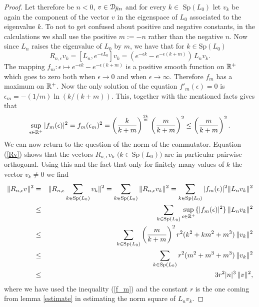 \documentclass[12pt]{article}
\begin{document}
\begin{proof}
Let therefore be $n<0$, $v \in {\mathcal D}\!_{f\!in}$ and for every $k \in$ Sp$(L_0)$ 
let $v_k$ be again the component of the vector $v$ in the eigenspace of
$L_0$ associated to the eigenvalue $k$.
To not to get confused about
positive and negative constants, in the calculations we shall use the
positive $m:=-n$ rather than the negative $n$. Now since $L_n$ raises the
eigenvalue of $L_0$ by $m$, we have that for $k \in $Sp$(L_0)$ 
\begin{equation}
\label{Rv} 
R_{n,\epsilon}v_k=[L_n,e^{-\epsilon L_0}]v_k =
(e^{-\epsilon k}-e^{-\epsilon (k+m)})\,L_nv_k. 
\end{equation} 
The mapping $f_m: \epsilon \mapsto e^{-\epsilon k}-e^{-\epsilon (k+m)}$ 
is a positive smooth function on ${\mathbb R}^+$ which goes to zero both when
$\epsilon \rightarrow 0$ and when $\epsilon \rightarrow \infty$. Therefore
$f_m$ has a maximum on ${\mathbb R}^+$.
Now the only solution of the
equation $f'_m(\epsilon)=0$ is $\epsilon_m=-(1/m) \ln (k/(k+m))$. This,
together with the mentioned facts gives that 
\begin{equation} 
\label{f_m}
\mathop{\rm sup}_{\epsilon \in {\mathbb R}^+}{|f_m(\epsilon)|^2}=
f_m(\epsilon_m)^2= \left(\frac{k}{k+m}\right)^{\frac{2k}{m}}
\left(\frac{m}{k+m}\right)^2 \leq \left( \frac{m}{k+m} \right)^2.
\end{equation} 
We can now return to the question of the norm of the
commutator. Equation (\ref{Rv}) shows that the vectors
$R_{n,\epsilon}v_k\,\, (k \in $Sp$(L_0))$ are in particular 
pairwise orthogonal. Using this and the fact that
only for finitely many values of $k$ the vector $v_k \neq 0$ we find
\begin{eqnarray} 
\nonumber 
\|R_{n,\epsilon}v\|^2 &=& \|R_{n,\epsilon}
\mathop{\sum}_{k \in {\rm Sp}(L_0)} v_k\|^2= 
\mathop{\sum}_{k \in {\rm Sp}(L_0)} \|R_{n,\epsilon}v_k\|^2
=\mathop{\sum}_{k \in {\rm Sp}(L_0)} |f_m(\epsilon)|^2\|L_nv_k\|^2 
\\ \nonumber
&\leq& \mathop{\sum}_{k \in {\rm Sp}(L_0)} 
\mathop{\rm sup}_{\epsilon \in {\mathbb R}^+}\{|f_m(\epsilon)|^2\} \, \|L_nv_k\|^2 
\\ \nonumber 
&\leq&
\mathop{\sum}_{k \in {\rm Sp}(L_0)} \left(\frac{m}{k+m} \right)^2
r^2 (k^2+km^2+m^3) \,\|v_k\|^2 
\\ \nonumber &\leq&
\mathop{\sum}_{k \in {\rm Sp}(L_0)} r^2 (m^2+m^3+m^3) \,\|v_k\|^2 
\\
&\leq& 3 r^2 |n|^3 \,\|v\|^2, 
\end{eqnarray} 
where we have used the inequality (\ref{f_m})  and the constant $r$
is the one coming from lemma \ref{estimate} in estimating the norm square
of $L_nv_k$. 
\end{proof}
\end{document}
